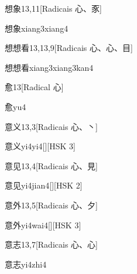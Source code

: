 \begin{entry}{想象}{13,11}[Radicais ⼼、⾗]
  \begin{phonetics}{想象}{xiang3xiang4}
  \end{phonetics}
\end{entry}

\begin{entry}{想想看}{13,13,9}[Radicais ⼼、⼼、⽬]
  \begin{phonetics}{想想看}{xiang3xiang3kan4}
  \end{phonetics}
\end{entry}

\begin{entry}{愈}{13}[Radical ⼼]
  \begin{phonetics}{愈}{yu4}
  \end{phonetics}
\end{entry}

\begin{entry}{意义}{13,3}[Radicais ⼼、⼂]
  \begin{phonetics}{意义}{yi4yi4}[][HSK 3]
  \end{phonetics}
\end{entry}

\begin{entry}{意见}{13,4}[Radicais ⼼、⾒]
  \begin{phonetics}{意见}{yi4jian4}[][HSK 2]
  \end{phonetics}
\end{entry}

\begin{entry}{意外}{13,5}[Radicais ⼼、⼣]
  \begin{phonetics}{意外}{yi4wai4}[][HSK 3]
  \end{phonetics}
\end{entry}

\begin{entry}{意志}{13,7}[Radicais ⼼、⼼]
  \begin{phonetics}{意志}{yi4zhi4}
  \end{phonetics}
\end{entry}


